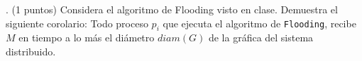 . (1 puntos) Considera el algoritmo de Flooding visto en clase. Demuestra el siguiente corolario:
Todo proceso $p_i$ que ejecuta el algoritmo de {\tt Flooding}, recibe $M$ en tiempo a lo más el diámetro $diam(G)$ de la gráfica del sistema distribuido.

 

